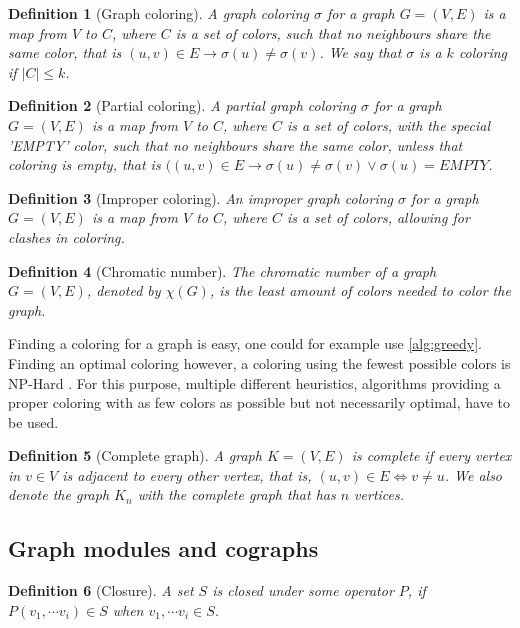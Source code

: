 \documentclass{amsart}
\newtheorem{definition}{Definition}[section]
\begin{document}
\begin{definition}[Graph coloring]
    A graph coloring $\sigma$ for a graph $G = (V,E)$ is a map from $V$ to $C$,
    where $C$ is a set of colors, such that no neighbours share the same color,
    that is $(u,v) \in E \to \sigma(u) \neq \sigma(v)$. We say that $\sigma$
    is a $k$ coloring if $|C| \leq k$.
\end{definition}
\begin{definition}[Partial coloring]
    A partial graph coloring $\sigma$ for a graph $G = (V,E)$ is a map from $V$ to $C$,
    where $C$ is a set of colors, with the special 'EMPTY' color, such that no
    neighbours share the same color, unless that coloring is empty, that is
    $((u,v) \in E \to \sigma(u) \neq \sigma(v) \vee \sigma(u) = EMPTY$. 
\end{definition}
\begin{definition}[Improper coloring]
    An improper graph coloring $\sigma$ for a graph $G = (V,E)$ is a map from $V$ to $C$,
    where $C$ is a set of colors, allowing for clashes in coloring.
\end{definition}
\begin{definition}[Chromatic number]
    The chromatic number of a graph $G = (V,E)$, denoted by $\chi(G)$,
    is the least amount of colors needed to color the graph. 
\end{definition}

Finding a coloring for a graph is easy, one could for example use
\autoref{alg:greedy}. Finding an optimal coloring however, a coloring using the
fewest possible colors is NP-Hard \cite{NPHard}. For this purpose, multiple
different heuristics, algorithms providing a proper coloring with as few colors
as possible but not necessarily optimal, have to be used.

\begin{definition}[Complete graph]
    A graph $K = (V,E)$ is complete if every vertex in $v \in V$ is adjacent to
    every other vertex, that is, $ (u,v) \in E \iff v \neq u$. We also denote the graph $K_n$ with the complete graph that
    has $n$ vertices.
\end{definition}

\subsection{Graph modules and cographs}
\label{sec:GraphModules}

\begin{definition}[Closure]
    A set $S$ is closed under some operator $P$, if 
    $ P(v_1,\cdots v_i) \in S$ when $v_1,\cdots v_i \in S$.
\end{definition}
\end{document}
